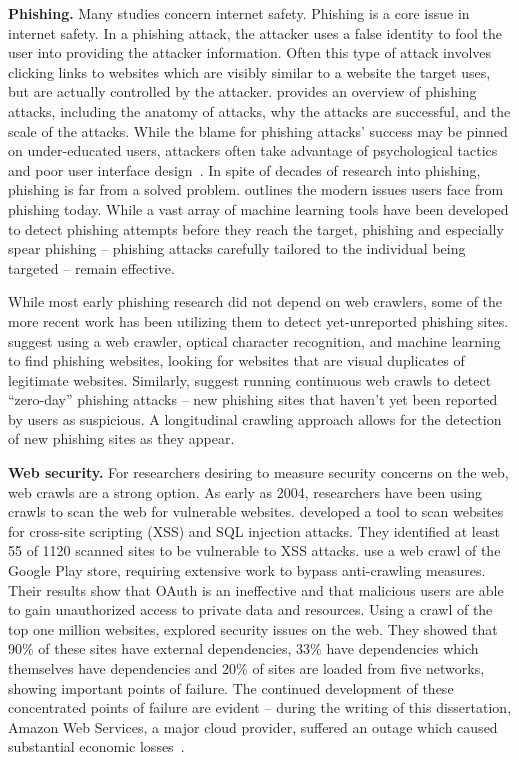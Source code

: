 \textbf{Phishing.} %
Many studies concern internet safety. Phishing is a core issue in internet safety. In a phishing attack, the attacker uses a false identity to fool the user into providing the attacker information. Often this type of attack involves clicking links to websites which are visibly similar to a website the target uses, but are actually controlled by the attacker. \citet{hong2012state} provides an overview of phishing attacks, including the anatomy of attacks, why the attacks are successful, and the scale of the attacks. While the blame for phishing attacks' success may be pinned on under-educated users, attackers often take advantage of psychological tactics and poor user interface design~\cite{dhamija2006phishing}. In spite of decades of research into phishing, phishing is far from a solved problem. \citet{das2019sok} outlines the modern issues users face from phishing today. While a vast array of machine learning tools have been developed to detect phishing attempts before they reach the target, phishing and especially spear phishing -- phishing attacks carefully tailored to the individual being targeted -- remain effective.

While most early phishing research did not depend on web crawlers, some of the more recent work has been utilizing them to detect yet-unreported phishing sites. \citet{tian2018needle} suggest using a web crawler, optical character recognition, and machine learning to find phishing websites, looking for websites that are visual duplicates of legitimate websites. Similarly, \citet{nathezhtha2019wc} suggest running continuous web crawls to detect ``zero-day'' phishing attacks -- new phishing sites that haven't yet been reported by users as suspicious. A longitudinal crawling approach allows for the detection of new phishing sites as they appear.

\textbf{Web security.}
For researchers desiring to measure security concerns on the web, web crawls are a strong option. As early as 2004, researchers have been using crawls to scan the web for vulnerable websites. \citet{huang2004non} developed a tool to scan websites for cross-site scripting (XSS) and SQL injection attacks. They identified at least 55 of 1120 scanned sites to be vulnerable to XSS attacks. \citet{viennot2014measurement} use a web crawl of the Google Play store, requiring extensive work to bypass anti-crawling measures. Their results show that OAuth is an ineffective and that malicious users are able to gain unauthorized access to private data and resources. Using a crawl of the top one million websites, \citet{kumar2017security} explored security issues on the web. They showed that 90\% of these sites have external dependencies, 33\% have dependencies which themselves have dependencies and 20\% of sites are loaded from five networks, showing important points of failure. The continued development of these concentrated points of failure are evident -- during the writing of this dissertation, Amazon Web Services, a major cloud provider, suffered an outage which caused substantial economic losses~\cite{cnbc2021awsoutage}.

